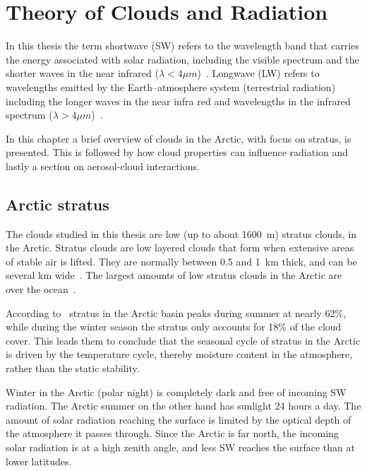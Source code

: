 \chapter{Theory of Clouds and Radiation}%
\label{chap:theory}
In this thesis the term shortwave (SW) refers to the wavelength band that carries the energy associated with solar radiation, including the visible spectrum and the shorter waves in the near infrared ($\lambda < 4\mu m$)~\citep{Wallace2006}. Longwave (LW) refers to wavelengths emitted by the Earth--atmosphere system (terrestrial radiation) including the longer waves in the near infra red and wavelengths in the infrared spectrum ($\lambda > 4\mu m$)~\citep{Wallace2006}. 

In this chapter a brief overview of clouds in the Arctic, with focus on stratus, is presented. This is followed by how cloud properties can influence radiation and lastly a section on aerosol-cloud interactions.

\section{Arctic stratus}
The clouds studied in this thesis are low (up to about 1600~m) stratus clouds, in the Arctic. Stratus clouds are low layered clouds that form when extensive areas of stable air is lifted. They are normally between 0.5 and 1~km thick, and can be several km wide~\citep{Aguado2010}. The largest amounts of low stratus clouds in the Arctic are over the ocean~\citep{Klein1993}.

According to~\citet{Klein1993} stratus in the Arctic basin peaks during summer at nearly 62\%, while during the winter season the stratus only accounts for 18\% of the cloud cover. This leads them to conclude that the seasonal cycle of stratus in the Arctic is driven by the temperature cycle, thereby moisture content in the atmosphere, rather than the static stability.

Winter in the Arctic (polar night) is completely dark and free of incoming SW radiation. The Arctic summer on the other hand has sunlight 24 hours a day. The amount of solar radiation reaching the surface is limited by the optical depth of the atmosphere it passes through. Since the Arctic is far north, the incoming solar radiation is at a high zenith angle, and less SW reaches the surface than at lower latitudes.

